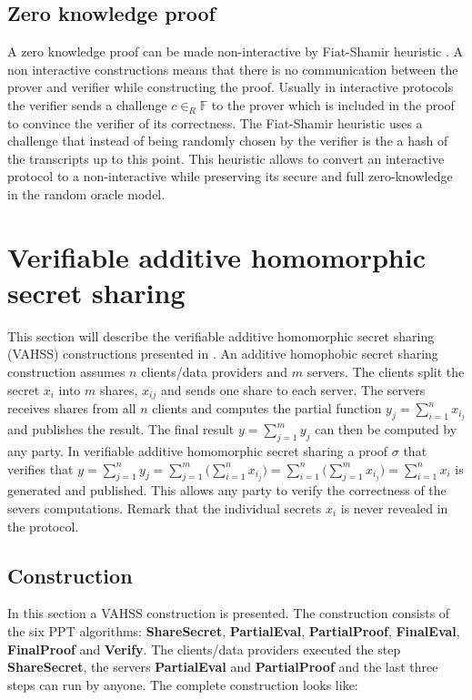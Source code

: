 \subsection*{Zero knowledge proof}
\cite{OG_ZKP}

A zero knowledge proof can be made non-interactive by Fiat-Shamir heuristic \cite{Fiat-Shamir}. A non interactive constructions means that there is no communication between the prover and verifier while constructing the proof. Usually in interactive protocols the verifier sends a challenge $c\in_R\mathds{F}$ to the prover which is included in the proof to convince the verifier of its correctness. The Fiat-Shamir heuristic uses a challenge that instead of being randomly chosen by the verifier is the a hash of the transcripts up to this point. This heuristic allows to convert an interactive protocol to a non-interactive while preserving its secure and full zero-knowledge in the random oracle model. 


\section{Verifiable additive homomorphic secret sharing}
\label{sec:VAHSS}
This section will describe the verifiable additive homomorphic secret sharing (VAHSS) constructions presented in \cite{VAHSS,SumItUp}. An additive homophobic secret sharing construction assumes $n$ clients/data providers and $m$ servers. The clients split the secret $x_i$ into $m$ shares, $x_{ij}$ and sends one share to each server. The servers receives shares from all $n$ clients and computes the partial function $y_j = \sum_{i=1}^n x_i_j $ and publishes the result. The final result $y = \sum_{j=1}^m y_j$ can then be computed by any party. In verifiable additive homomorphic secret sharing a proof $\sigma$ that verifies that $y= \sum_{j=1}^n y_j= \sum_{j=1}^m \big( \sum_{i=1}^n  x_i_j \big) =  \sum_{i=1}^n \big( \sum_{j=1}^m  x_i_j \big)  = \sum_{i=1}^n x_i$ is generated and published. This allows any party to verify the correctness of the severs computations. Remark that the individual secrets $x_i$ is never revealed in the protocol.


\subsection*{Construction}
In this section a VAHSS construction  is presented. The construction consists of the six PPT algorithms: \textbf{ShareSecret}, \textbf{PartialEval}, \textbf{PartialProof}, \textbf{FinalEval}, \textbf{FinalProof} and \textbf{Verify}. The clients/data providers executed the step \textbf{ShareSecret}, the servers \textbf{PartialEval} and \textbf{PartialProof} and the last three steps can run by anyone. The complete construction looks like:

